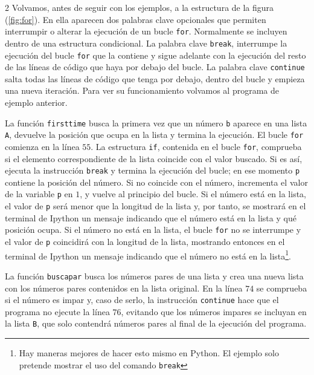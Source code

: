 \begin{paracol}{2}
Volvamos, antes de seguir con los ejemplos, a la estructura de la figura (\ref{fig:for}). En ella aparecen dos palabras clave opcionales que permiten interrumpir o alterar la ejecución de un bucle \texttt{for}. Normalmente se incluyen dentro de una estructura condicional. La palabra clave \texttt{break}, interrumpe la ejecución del bucle \texttt{for} que la contiene y sigue adelante con la ejecución del resto de las líneas de código que haya por debajo del bucle. La palabra clave \texttt{continue} salta todas las líneas de código que tenga por debajo, dentro del bucle y empieza una nueva iteración. Para ver su funcionamiento volvamos al programa de ejemplo anterior.

La función \texttt{firsttime} busca la primera vez que un número \texttt{b} aparece en una lista \texttt{A}, devuelve la posición que ocupa en la lista y termina la ejecución. El bucle \texttt{for} comienza en la línea $55$. La estructura \texttt{if}, contenida en el bucle \texttt{for}, comprueba si el elemento correspondiente de la lista coincide con el valor buscado. Si es así, ejecuta la instrucción \texttt{break} y termina la ejecución del bucle; en ese momento \texttt{p} contiene la posición del número. Si no coincide con el número, incrementa el valor de la variable \texttt{p} en $1$, y vuelve al principio del bucle. Si el número está en la lista, el valor de \texttt{p} será menor que la longitud de la lista y, por tanto, se mostrará en el terminal de Ipython un mensaje indicando que el número está en la lista y qué posición ocupa. Si el número no está en la lista, el bucle \texttt{for} no se interrumpe y el valor de \texttt{p} coincidirá con la longitud de la lista, mostrando entonces en el terminal de Ipython un mensaje indicando que el número no está en la lista\footnote{Hay maneras mejores de hacer esto mismo en Python. El ejemplo solo pretende mostrar el uso del comando \texttt{break}}.

La función \texttt{buscapar} busca los números pares de una lista y crea una nueva lista con los números pares contenidos en la lista original. En la línea $74$ se comprueba si el número es impar y, caso de serlo, la instrucción \texttt{continue} hace que el programa no ejecute la línea $76$, evitando que los números impares se incluyan en la lista \texttt{B}, que solo contendrá números pares al final de la ejecución del programa.


\end{paracol}
